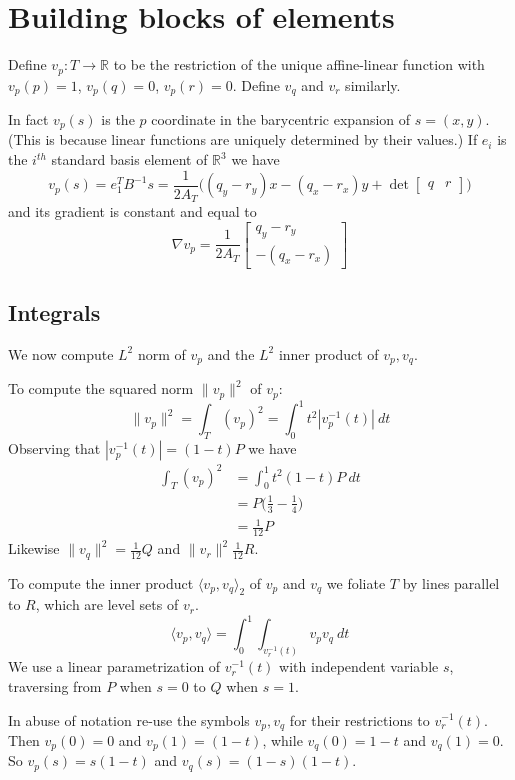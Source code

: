 \documentclass[12pt]{amsart}
\providecommand{\to}{\longrightarrow }
\begin{document}
\section*{Building blocks of elements}

Define $v_p:T\to \mathbb{R}$ to be the restriction of the unique affine-linear function with $v_p(p) = 1$, $v_p(q) = 0$, $v_p(r) = 0$. Define $v_q$ and $v_r$ similarly.

In fact $v_p(s)$ is the $p$ coordinate in the barycentric expansion of $s = (x,y)$. (This is because linear functions are uniquely determined by their values.) If $e_i$ is the $i^{th}$ standard basis element of $\mathbb{R}^3$ we have
\[ v_p(s) = e_1^T B^{-1} s = \frac{1}{2A_T}\bigg( (q_y - r_y)x - (q_x - r_x)y + \det\left[\begin{array}{c|c} q & r \end{array}\right] \bigg)\]
and its gradient is constant and equal to
\[ \nabla v_p = \frac{1}{2A_T} \begin{bmatrix} q_y - r_y \\ -(q_x - r_x) \end{bmatrix} \]

\subsection*{Integrals}

We now compute $L^2$ norm of $v_p$ and the $L^2$ inner product of $v_p, v_q$.

To compute the squared norm $\|v_p\|^2$ of $v_p$:
\[ \|v_p\|^2 = \int_T (v_p)^2 = \int_0^1 t^2 |v_p^{-1}(t)|\ dt \]
Observing that $|v_p^{-1}(t)| = (1-t)P$ we have
\begin{align*}
\int_T (v_p)^2 &= \int_0^1 t^2(1-t)P\ dt\\
	& = P\bigg(\frac{1}{3} - \frac{1}{4}\bigg) \\
	& = \frac{1}{12}P
\end{align*}
Likewise $\|v_q\|^2 = \frac{1}{12}Q$ and $\|v_r\|^2 \frac{1}{12}R.$

To compute the inner product $\langle v_p, v_q\rangle_2$ of $v_p$ and $v_q$ we foliate $T$ by lines parallel to $R$, which are level sets of $v_r$.
\[ \langle v_p, v_q\rangle = \int_0^1 \int_{v_r^{-1}(t)} v_pv_q\ dt \]
We use a linear parametrization of $v_r^{-1}(t)$ with independent variable $s$, traversing from $P$ when $s=0$ to $Q$ when $s = 1$.

In abuse of notation re-use the symbols $v_p, v_q$ for their restrictions to $v_r^{-1}(t)$. Then $v_p(0) = 0$ and $v_p(1) = (1-t)$, while $v_q(0) = 1-t$ and $v_q(1) = 0$. So $v_p(s) = s(1-t)$ and $v_q(s) = (1-s)(1-t)$.
\end{document}

